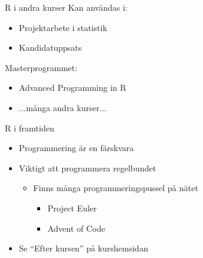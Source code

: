 \documentclass[
  11pt,
  ignorenonframetext,
  handout]{beamer}
\providecommand{\tightlist}{%
  \setlength{\itemsep}{0pt}\setlength{\parskip}{0pt}}
\begin{document}

\begin{frame}{R i andra kurser}
\protect\hypertarget{r-i-andra-kurser-1}{}
Kan användas i:

\begin{itemize}
\tightlist
\item
  Projektarbete i statistik
\item
  Kandidatuppsats
\end{itemize}

Masterprogrammet:

\begin{itemize}
\tightlist
\item
  Advanced Programming in R
\item
  ...många andra kurser...
\end{itemize}
\end{frame}


\begin{frame}{R i framtiden}
\protect\hypertarget{r-i-framtiden}{}
\begin{itemize}
\tightlist
\item
  Programmering är en färskvara
\item
  Viktigt att programmera regelbundet

  \begin{itemize}
  \tightlist
  \item
    Finns många programmeringspussel på nätet

    \begin{itemize}
    \tightlist
    \item
      Project Euler
    \item
      Advent of Code
    \end{itemize}
  \end{itemize}
\item
  Se ``Efter kursen'' på kurshemsidan
\end{itemize}
\end{frame}

\end{document}
